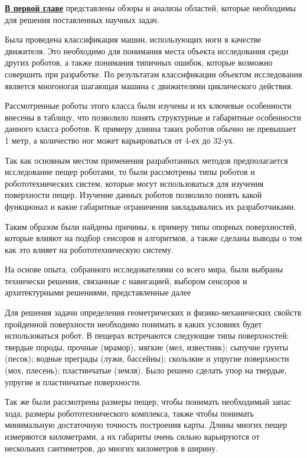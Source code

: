 
\textbf{\underline{В первой главе}} представлены обзоры и анализы областей, которые необходимы для решения поставленных научных задач.

Была проведена классификация машин, использующих ноги в качестве движителя. Это необходимо для понимания места объекта исследования среди других роботов, а также понимания типичных ошибок, которые возможно совершить при разработке. По результатам классификации объектом исследования является многоногая шагающая машина с движителями циклического действия.

Рассмотренные роботы этого класса были изучены и их ключевые особенности внесены в таблицу, что позволило понять структурные и габаритные особенности данного класса роботов. К примеру длинна таких роботов обычно не превышает 1 метр, а количество ног может варьироваться от 4-ех до 32-ух.

Так как основным местом применения разработанных методов предполагается исследование пещер роботами, то были рассмотрены типы роботов и робототехнических систем, которые могут использоваться для изучения поверхности пещер. Изучение данных роботов позволило понять какой функционал и какие габаритные ограничения закладывались их разработчиками.

Таким образом были найдены причины, к примеру типы опорных поверхностей, которые влияют на подбор сенсоров и алгоритмов, а также сделаны выводы о том как это влияет на робототехническую систему. 

На основе опыта, собранного исследователями со всего мира, были выбраны технически решения, связанные с навигацией, выбором сенсоров и архитектурными решениями, представленные далее

Для решения задачи определения геометрических и физико-механических свойств пройденной поверхности необходимо понимать в каких условиях будет использоваться робот. В пещерах встречаются следующие типы поверхностей: твердые породы, прочные (мрамор), мягкие (мел, известняк); сыпучие грунты (песок); водные преграды (лужи, бассейны); скользкие и упругие поверхности (мох, плесень); пластинчатые (земля). Было решено сделать упор на твердые, упругие и пластинчатые поверхности.

Так же были рассмотрены размеры пещер, чтобы понимать необходимый запас хода, размеры робототехнического комплекса, также чтобы понимать минимальную достаточную точность построения карты. Длины многих пещер измеряются километрами, а их габариты очень сильно варьируются от нескольких сантиметров, до многих километров в ширину.

